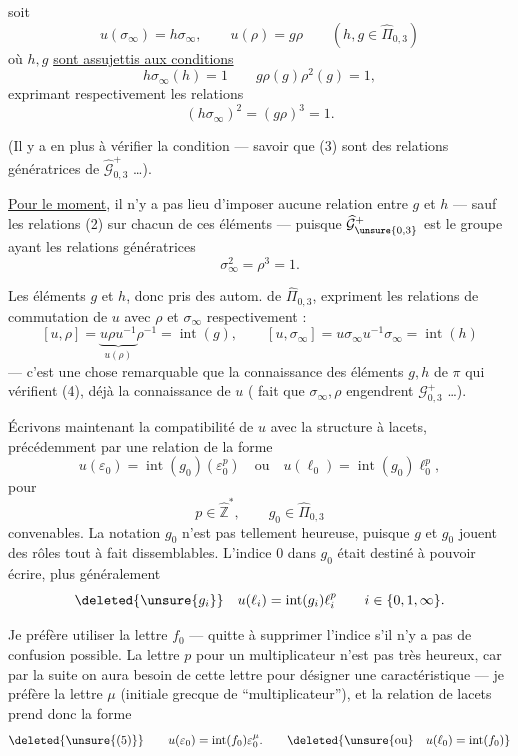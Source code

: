 soit
\[
\tag{1}
\boxed{u(\sigma_\infty)=h\sigma_\infty,\qquad u(\rho)=g\rho}
\qquad (h,g\in\widehat{\Pi}_{0,3})
\]
où $h,g$ \uline{sont assujettis aux conditions}
\[
\tag{2}
\boxed{h\sigma_\infty(h)=1\qquad g\rho(g)\rho^2(g)=1},
\]
exprimant respectivement les relations
\[
\tag{3}
\boxed{(h\sigma_\infty)^2=(g\rho)^3=1}.
\]

(Il y a en plus à vérifier la condition  --- savoir que (3) sont des relations génératrices de $\widehat{\mathcal G}_{0,3}^{+}$ \dots).

\uline{Pour le moment}, il n'y a pas lieu d'imposer aucune relation entre $g$ et $h$ --- sauf les relations (2) sur chacun de ces éléments --- puisque $\widehat{\mathcal G}_{\unsure{0,3}}^{+}$ est le groupe ayant les relations génératrices
\[
\sigma_\infty^2=\rho^3=1.
\]



Les éléments $g$ et $h$, donc pris  des autom. de $\widehat{\Pi}_{0,3}$, expriment les relations de commutation de $u$ avec \deleted{$\sigma_\infty$} $\rho$ et $\sigma_\infty$ respectivement :
\[
\tag{4}
[u,\rho]=\underbrace{u\rho u^{-1}}_{u(\rho)}\rho^{-1}=\operatorname{int}(g),
\qquad
[u,\sigma_\infty]=u\sigma_\infty u^{-1}\sigma_\infty=\operatorname{int}(h)
\]
--- c'est une chose remarquable que la connaissance des éléments $g,h$ de $\pi$ qui vérifient (4), \uline{} déjà la connaissance de $u$ (  fait que $\sigma_\infty,\rho$ engendrent $\mathcal G_{0,3}^{+}$ \dots).

Écrivons maintenant la compatibilité de $u$ avec la structure à lacets,   précédemment par une relation de la forme
\[
u(\varepsilon_0)=\operatorname{int}(g_0)(\varepsilon_0^p)
\quad\text{ou}\quad
u(\ell_0)=\operatorname{int}(g_0)\ell_0^p,
\]
pour
\[
p\in\widehat{\mathbb Z}^{*},\qquad g_0\in\widehat{\Pi}_{0,3}
\]
convenables. La notation $g_0$ n'est pas tellement heureuse, puisque $g$ et $g_0$ jouent des rôles tout à fait dissemblables. L'indice $0$ dans $g_0$ était destiné à pouvoir écrire, plus généralement
\[
\deleted{\unsure{g_i}}\quad
u(\ell_i)=\operatorname{int}(g_i)\ell_i^p
\qquad i\in\{0,1,\infty\}.
\]



Je préfère utiliser la lettre $f_0$ --- quitte à supprimer l'indice s'il n'y a pas de confusion possible. La lettre $p$ pour un multiplicateur n'est pas  très heureux, car par la suite  on aura  besoin de cette lettre pour désigner une caractéristique --- je préfère la lettre $\mu$ (initiale grecque de ``multiplicateur''), et la relation de lacets prend donc la forme
\[
\deleted{\unsure{(5)}}\qquad
u(\varepsilon_0)=\operatorname{int}(f_0)\varepsilon_0^\mu.
\qquad
\deleted{\unsure{\text{ou}}\quad u(\ell_0)=\operatorname{int}(f_0)}
\]

